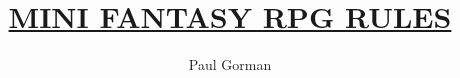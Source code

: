 \documentclass[fontsize=9pt,twoside]{scrreprt}
\begin{document}
\title{\normalfont\normalsize \uline{MINI FANTASY RPG RULES}}

\author{\normalsize Paul Gorman}
\date{}
\maketitle


\end{document}
